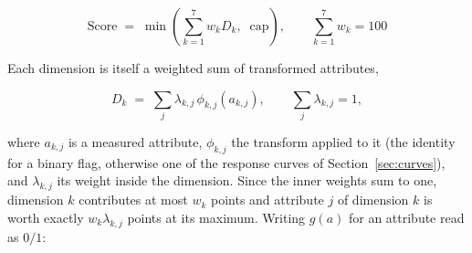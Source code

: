 \documentclass[11pt,a4paper]{article}
\begin{document}
\begin{equation}
\boxed{\;
\text{Score} \;=\; \min\!\left( \sum_{k=1}^{7} w_k D_k,\;\; \text{cap} \right),
\qquad \sum_{k=1}^{7} w_k = 100 \;}
\label{eq:score}
\end{equation}

\noindent Each dimension is itself a weighted sum of transformed attributes,

\begin{equation}
D_k \;=\; \sum_{j} \lambda_{k,j}\, \phi_{k,j}\!\left(a_{k,j}\right),
\qquad \sum_j \lambda_{k,j} = 1,
\label{eq:dim}
\end{equation}

\noindent where $a_{k,j}$ is a measured attribute, $\phi_{k,j}$ the transform applied to it (the
identity for a binary flag, otherwise one of the response curves of Section~\ref{sec:curves}), and
$\lambda_{k,j}$ its weight inside the dimension. Since the inner weights sum to one, dimension $k$
contributes at most $w_k$ points and attribute $j$ of dimension $k$ is worth exactly
$w_k \lambda_{k,j}$ points at its maximum. Writing $g(a)$ for an attribute read as $0/1$:
\end{document}
